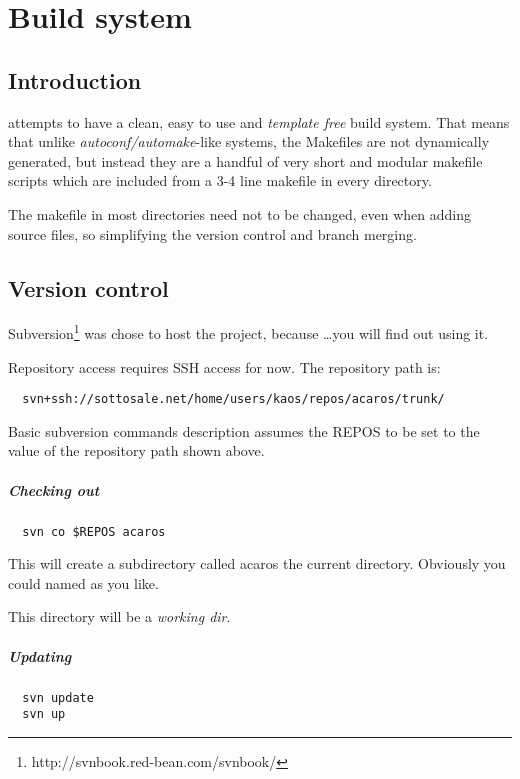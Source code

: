 \chapter{Build system}
\label{ch:build}

\section{Introduction}

\acaros attempts to have a clean, easy to use and \emph{template free} build system.
That means that unlike \emph{autoconf/automake}-like systems, the Makefiles are not
dynamically generated, but instead they are a handful of very short and modular makefile scripts
which are included from a 3-4 line makefile in every directory. 

The makefile in most directories need not to be changed, even when adding source files,
so simplifying the version control and branch merging.

\section{Version control}

\textsf{Subversion}\footnote{http://svnbook.red-bean.com/svnbook/} was chose to host the project, because \ldots you will find out using it.

Repository access requires SSH access for now.
The repository path is:

\begin{verbatim}
  svn+ssh://sottosale.net/home/users/kaos/repos/acaros/trunk/
\end{verbatim}

Basic subversion commands description assumes the \textsf{REPOS} to be set
to the value of the repository path shown above.

\paragraph{Checking out}
\begin{verbatim}
  svn co $REPOS acaros
\end{verbatim} %

This will create a subdirectory called \textsf{acaros} the current directory.
Obviously you could named as you like.

This directory will be a \emph{working dir}.

\paragraph{Updating}
\begin{verbatim}
  svn update
  svn up
\end{verbatim}

